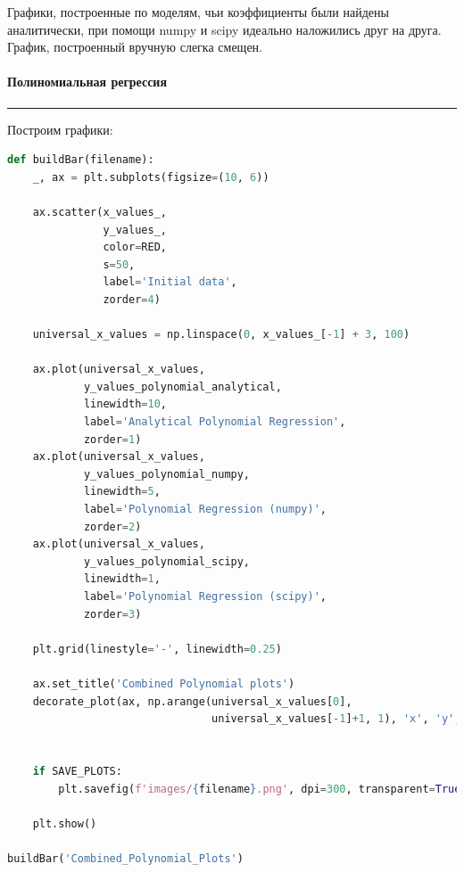 \documentclass[a4paper, 14pt]{extarticle}
\begin{document}
Графики, построенные по моделям, чьи коэффициенты были найдены аналитически, при помощи numpy и scipy 
идеально наложились друг на друга. График, построенный вручную слегка смещен.

\paragraph*{{Полиномиальная регрессия}}\vspace{-20pt}\rule{\linewidth}{0.1mm}

Построим графики:

\begin{center}
    \begin{lstlisting}[language=Python]
def buildBar(filename):
    _, ax = plt.subplots(figsize=(10, 6))

    ax.scatter(x_values_, 
               y_values_, 
               color=RED,
               s=50,
               label='Initial data', 
               zorder=4)

    universal_x_values = np.linspace(0, x_values_[-1] + 3, 100)

    ax.plot(universal_x_values, 
            y_values_polynomial_analytical, 
            linewidth=10, 
            label='Analytical Polynomial Regression', 
            zorder=1)
    ax.plot(universal_x_values, 
            y_values_polynomial_numpy, 
            linewidth=5, 
            label='Polynomial Regression (numpy)', 
            zorder=2)
    ax.plot(universal_x_values, 
            y_values_polynomial_scipy, 
            linewidth=1, 
            label='Polynomial Regression (scipy)', 
            zorder=3)

    plt.grid(linestyle='-', linewidth=0.25)

    ax.set_title('Combined Polynomial plots')
    decorate_plot(ax, np.arange(universal_x_values[0], 
                                universal_x_values[-1]+1, 1), 'x', 'y', loc=(0.005, 
                                                                             0.75))
    
    if SAVE_PLOTS:
        plt.savefig(f'images/{filename}.png', dpi=300, transparent=True)

    plt.show()

buildBar('Combined_Polynomial_Plots')
    \end{lstlisting}
\end{center}
\end{document}

